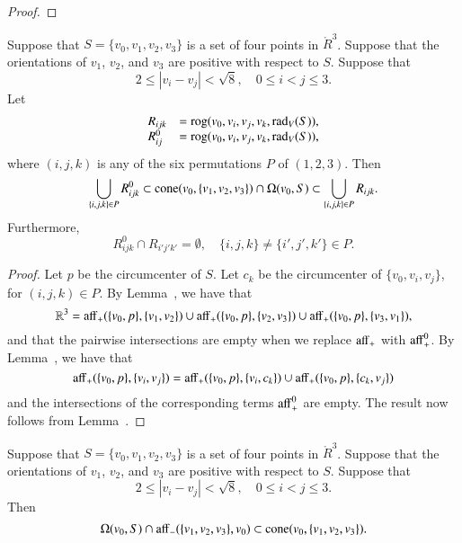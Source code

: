 \begin{proof}
\end{proof}
\newpage

\begin{lemma}
Suppose that $S=\{v_0,v_1,v_2,v_3\}$ is a set
of four points in $\ring{R}^3$.  Suppose that 
the orientations of $v_1$, $v_2$, and $v_3$ are positive with respect
to $S$.  Suppose that 
  $$
  2 \le |v_i - v_j | < \sqrt8, \quad 0\le i < j \le 3.
  $$
Let 
   $$
   \begin{array}{lll}
   R_{ijk} &= {\operatorname{rog}}(v_0,v_i,v_j,v_k,\operatorname{rad}_V(S)),\\
   R^0_{ij} &= {\operatorname{rog}}(v_0,v_i,v_j,v_k,\operatorname{rad}_V(S)),
   \end{array}
   $$
where $(i,j,k)$ is any of the six permutations $P$ of $(1,2,3)$.
Then
   $$
   \bigcup_{\{i,j,k\}\in P} R_{ijk}^0\subset
   {\operatorname{cone}}(v_0,\{v_1,v_2,v_3\})\cap \Omega(v_0,S) \subset
   \bigcup_{\{i,j,k\}\in P} R_{ijk}.
   $$
Furthermore,
   $$
   R_{ijk}^0 \cap R_{i'j'k'} =\emptyset,\quad
   \{i,j,k\}\ne\{i',j',k'\}\in P.
   $$
\end{lemma}

\begin{proof} Let $p$ be the circumcenter of $S$.  Let $c_k$
be the circumcenter of $\{v_0,v_i,v_j\}$, for $(i,j,k)\in P$.
By Lemma~, we have that
   $$
   \mathbb{R}^3 = {\operatorname{aff}}_+(\{v_0,p\},\{v_1,v_2\}) \cup
     {\operatorname{aff}}_+(\{v_0,p\},\{v_2,v_3\}) \cup
     {\operatorname{aff}}_+(\{v_0,p\},\{v_3,v_1\}),
   $$
and that the pairwise intersections are empty when we replace
${\operatorname{aff}}_+$ with ${\operatorname{aff}}_+^0$.  By Lemma~,
we have that 
  $$
  {\operatorname{aff}}_+(\{v_0,p\},\{v_i,v_j\}) =
{\operatorname{aff}}_+(\{v_0,p\},\{v_i,c_k\}) \cup
{\operatorname{aff}}_+(\{v_0,p\},\{c_k,v_j\})
  $$
and the intersections of the corresponding terms ${\operatorname{aff}}_+^0$ 
are empty.
The result now follows from Lemma~.
\end{proof}

\newpage

\begin{lemma}
Suppose that $S=\{v_0,v_1,v_2,v_3\}$ is a set
of four points in $\ring{R}^3$.  Suppose that
the orientations of $v_1$, $v_2$, and $v_3$ are positive with respect
to $S$.  Suppose that
  $$
  2 \le |v_i - v_j | < \sqrt8, \quad 0\le i < j \le 3.
  $$
Then
  $$
  \Omega(v_0,S) \cap {\operatorname{aff}}_-(\{v_1,v_2,v_3\},v_0) \subset
  {\operatorname{cone}}(v_0,\{v_1,v_2,v_3\}).
  $$
\end{lemma}




